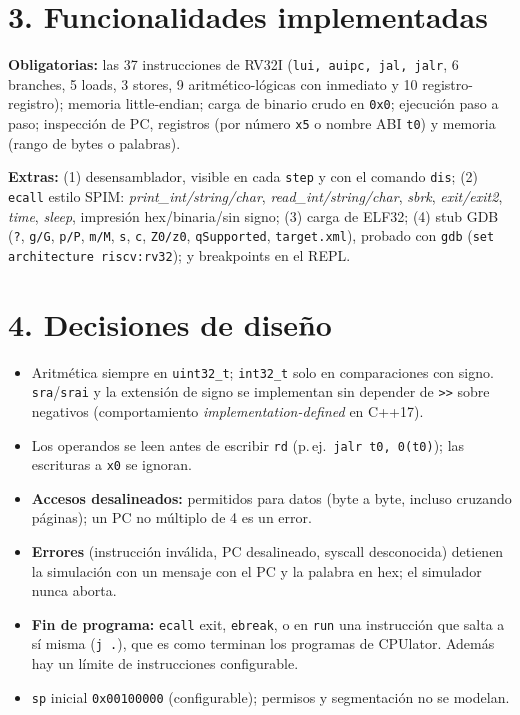 \documentclass[11pt,a4paper]{article}
\begin{document}
\section*{3. Funcionalidades implementadas}
\textbf{Obligatorias:} las 37 instrucciones de RV32I (\texttt{lui, auipc, jal, jalr}, 6 branches,
5 loads, 3 stores, 9 aritmético-lógicas con inmediato y 10 registro-registro); memoria
little-endian; carga de binario crudo en \texttt{0x0}; ejecución paso a paso; inspección de PC,
registros (por número \texttt{x5} o nombre ABI \texttt{t0}) y memoria (rango de bytes o palabras).

\textbf{Extras:} (1) desensamblador, visible en cada \texttt{step} y con el comando \texttt{dis};
(2) \texttt{ecall} estilo SPIM: \emph{print\_int/string/char}, \emph{read\_int/string/char},
\emph{sbrk}, \emph{exit/exit2}, \emph{time}, \emph{sleep}, impresión hex/binaria/sin signo;
(3) carga de ELF32; (4) stub GDB (\texttt{?}, \texttt{g/G}, \texttt{p/P}, \texttt{m/M},
\texttt{s}, \texttt{c}, \texttt{Z0/z0}, \texttt{qSupported}, \texttt{target.xml}), probado con
\texttt{gdb} (\texttt{set architecture riscv:rv32}); y breakpoints en el REPL.

\section*{4. Decisiones de diseño}
\begin{itemize}
  \item Aritmética siempre en \texttt{uint32\_t}; \texttt{int32\_t} solo en comparaciones con signo.
    \texttt{sra}/\texttt{srai} y la extensión de signo se implementan sin depender de
    \texttt{>>} sobre negativos (comportamiento \emph{implementation-defined} en C++17).
  \item Los operandos se leen antes de escribir \texttt{rd} (p.\,ej.\ \texttt{jalr t0, 0(t0)});
    las escrituras a \texttt{x0} se ignoran.
  \item \textbf{Accesos desalineados:} permitidos para datos (byte a byte, incluso cruzando
    páginas); un PC no múltiplo de 4 es un error.
  \item \textbf{Errores} (instrucción inválida, PC desalineado, syscall desconocida) detienen la
    simulación con un mensaje con el PC y la palabra en hex; el simulador nunca aborta.
  \item \textbf{Fin de programa:} \texttt{ecall} exit, \texttt{ebreak}, o en \texttt{run} una
    instrucción que salta a sí misma (\mbox{\texttt{j .}}), que es como terminan los programas de CPUlator.
    Además hay un límite de instrucciones configurable.
  \item \texttt{sp} inicial \texttt{0x00100000} (configurable); permisos y segmentación no se modelan.
\end{itemize}
\end{document}
